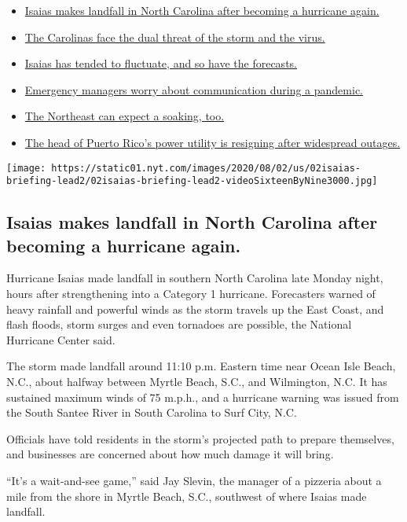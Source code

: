 \begin{itemize}
\tightlist
\item
  \protect\hyperlink{link-34a2c843}{Isaias makes landfall in North
  Carolina after becoming a hurricane again.}
\item
  \protect\hyperlink{link-f7e08eb}{The Carolinas face the dual threat of
  the storm and the virus.}
\item
  \protect\hyperlink{link-64deafd3}{Isaias has tended to fluctuate, and
  so have the forecasts.}
\item
  \protect\hyperlink{link-536a9c31}{Emergency managers worry about
  communication during a pandemic.}
\item
  \protect\hyperlink{link-52f7dcb}{The Northeast can expect a soaking,
  too.}
\item
  \protect\hyperlink{link-303d84ae}{The head of Puerto Rico's power
  utility is resigning after widespread outages.}
\end{itemize}

\texttt{[image: https://static01.nyt.com/images/2020/08/02/us/02isaias-briefing-lead2/02isaias-briefing-lead2-videoSixteenByNine3000.jpg]}

\hypertarget{isaias-makes-landfall-in-north-carolina-after-becoming-a-hurricane-again}{%
\subsection{Isaias makes landfall in North Carolina after becoming a
hurricane
again.}\label{isaias-makes-landfall-in-north-carolina-after-becoming-a-hurricane-again}}

Hurricane Isaias made landfall in southern North Carolina late Monday
night, hours after strengthening into a Category 1 hurricane.
Forecasters warned of heavy rainfall and powerful winds as the storm
travels up the East Coast, and flash floods, storm surges and even
tornadoes are possible, the National Hurricane Center said.

The storm made landfall around 11:10 p.m. Eastern time near Ocean Isle
Beach, N.C., about halfway between Myrtle Beach, S.C., and Wilmington,
N.C. It has sustained maximum winds of 75 m.p.h., and a hurricane
warning was issued from the South Santee River in South Carolina to Surf
City, N.C.

Officials have told residents in the storm's projected path to prepare
themselves, and businesses are concerned about how much damage it will
bring.

``It's a wait-and-see game,'' said Jay Slevin, the manager of a pizzeria
about a mile from the shore in Myrtle Beach, S.C., southwest of where
Isaias made landfall.

